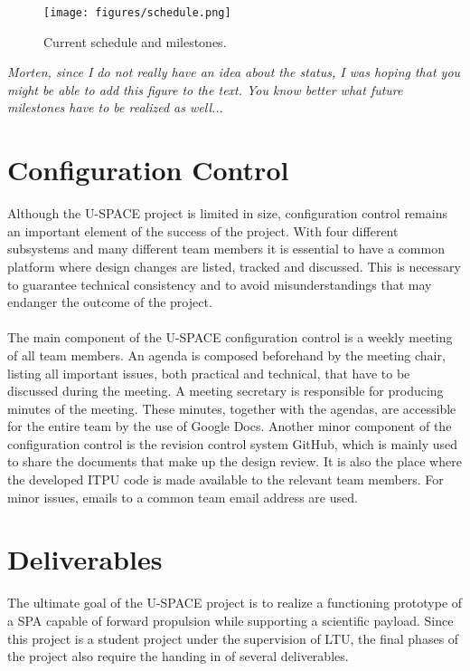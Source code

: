 \begin{figure}[htbp!]
\centering
\texttt{[image: figures/schedule.png]}
\caption{Current schedule and milestones.}
\label{fig:schedule}
\end{figure}

\textit{Morten, since I do not really have an idea about the status, I was hoping that you might be able to add this figure to the text. You know better what future milestones have to be realized as well...}

\section{Configuration Control}

Although the \ac{U-SPACE} project is limited in size, configuration control remains an important element of the success of the project. With four different subsystems and many different team members it is essential to have a common platform where design changes are listed, tracked and discussed. This is necessary to guarantee technical consistency and to avoid misunderstandings that may endanger the outcome of the project.
\\
\\
The main component of the \ac{U-SPACE} configuration control is a weekly meeting of all team members. An agenda is composed beforehand by the meeting chair, listing all important issues, both practical and technical, that have to be discussed during the meeting. A meeting secretary is responsible for producing minutes of the meeting. These minutes, together with the agendas, are accessible for the entire team by the use of Google Docs. Another minor component of the configuration control is the revision control system GitHub, which is mainly used to share the documents that make up the design review. It is also the place where the developed \ac{ITPU} code is made available to the relevant team members. For minor issues, emails to a common team email address are used.

\section{Deliverables}

The ultimate goal of the \ac{U-SPACE} project is to realize a functioning prototype of a \ac{SPA} capable of forward propulsion while supporting a scientific payload. Since this project is a student project under the supervision of \ac{LTU}, the final phases of the project also require the handing in of several deliverables.

